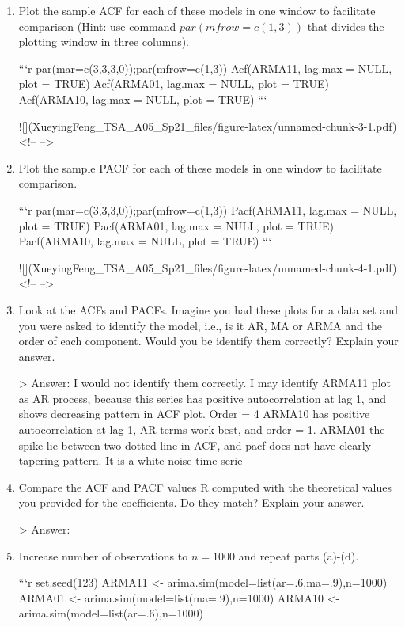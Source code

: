 \documentclass[
]{article}
\begin{document}
\begin{enumerate}[label=(\alph*)]

\item Plot the sample ACF for each of these models in one window to facilitate comparison (Hint: use command $par(mfrow=c(1,3))$ that divides the plotting window in three columns). 


```r
par(mar=c(3,3,3,0));par(mfrow=c(1,3))
Acf(ARMA11, lag.max = NULL, plot = TRUE)
Acf(ARMA01, lag.max = NULL, plot = TRUE)
Acf(ARMA10, lag.max = NULL, plot = TRUE)
```

![](XueyingFeng_TSA_A05_Sp21_files/figure-latex/unnamed-chunk-3-1.pdf)<!-- --> 


\item Plot the sample PACF for each of these models in one window to facilitate comparison.  


```r
par(mar=c(3,3,3,0));par(mfrow=c(1,3))
Pacf(ARMA11, lag.max = NULL, plot = TRUE)
Pacf(ARMA01, lag.max = NULL, plot = TRUE)
Pacf(ARMA10, lag.max = NULL, plot = TRUE)
```

![](XueyingFeng_TSA_A05_Sp21_files/figure-latex/unnamed-chunk-4-1.pdf)<!-- --> 

\item Look at the ACFs and PACFs. Imagine you had these plots for a data set and you were asked to identify the model, i.e., is it AR, MA or ARMA and the order of each component. Would you be identify them correctly? Explain your answer.

> Answer: I would not identify them correctly. 
I may identify ARMA11 plot as AR process, because this series has positive autocorrelation at lag 1, and shows decreasing pattern in ACF plot. Order = 4
ARMA10 has positive autocorrelation at lag 1, AR terms work best, and order = 1. 
ARMA01 the spike lie between two dotted line in ACF, and pacf does not have clearly tapering pattern. It is a white noise time serie

\item Compare the ACF and PACF values R computed with the theoretical values you provided for the coefficients. Do they match? Explain your answer.

> Answer: 


\item Increase number of observations to $n=1000$ and repeat parts (a)-(d).


```r
set.seed(123)
ARMA11 <- arima.sim(model=list(ar=.6,ma=.9),n=1000)
ARMA01 <- arima.sim(model=list(ma=.9),n=1000)
ARMA10 <- arima.sim(model=list(ar=.6),n=1000)


\end{enumerate}
\end{document}
